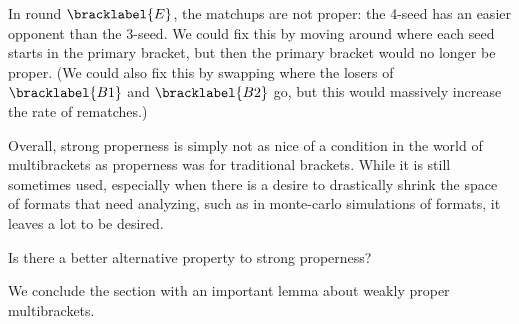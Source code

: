 {    

    In round $\bracklabel{E}$, the matchups are not proper: the 4-seed has an easier opponent than the 3-seed. We could fix this by moving around where each seed starts in the primary bracket, but then the primary bracket would no longer be proper. (We could also fix this by swapping where the losers of $\bracklabel{B1}$ and $\bracklabel{B2}$ go, but this would massively increase the rate of rematches.)

    Overall, strong properness is simply not as nice of a condition in the world of multibrackets as properness was for traditional brackets. While it is still sometimes used, especially when there is a desire to drastically shrink the space of formats that need analyzing, such as in monte-carlo simulations of formats, it leaves a lot to be desired.

    \begin{oq}{}{}
        Is there a better alternative property to strong properness?
    \end{oq}

    We conclude the section with an important lemma about weakly proper multibrackets.

    



}



